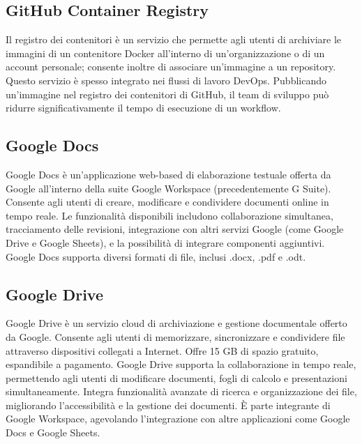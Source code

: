 \vspace{2em}
\subsection*{GitHub Container Registry}
\par Il registro dei contenitori è un servizio che permette agli utenti di archiviare le immagini di un contenitore Docker all'interno di un'organizzazione o di un account personale; consente inoltre di associare un'immagine a un repository. Questo servizio è spesso integrato nei flussi di lavoro DevOps. Pubblicando un'immagine nel registro dei contenitori di GitHub, il team di sviluppo può ridurre significativamente il tempo di esecuzione di un workflow.

\vspace{2em}
\subsection*{Google Docs}
\par Google Docs è un'applicazione web-based di elaborazione testuale offerta da Google all'interno della suite Google Workspace (precedentemente G Suite). Consente agli utenti di creare, modificare e condividere documenti online in tempo reale. Le funzionalità disponibili includono collaborazione simultanea, tracciamento delle revisioni, integrazione con altri servizi Google (come Google Drive e Google Sheets), e la possibilità di integrare componenti aggiuntivi. Google Docs supporta diversi formati di file, inclusi .docx, .pdf e .odt.

\vspace{2em}
\subsection*{Google Drive}
\par Google Drive è un servizio cloud di archiviazione e gestione documentale offerto da Google. Consente agli utenti di memorizzare, sincronizzare e condividere file attraverso dispositivi collegati a Internet. Offre 15 GB di spazio gratuito, espandibile a pagamento. Google Drive supporta la collaborazione in tempo reale, permettendo agli utenti di modificare documenti, fogli di calcolo e presentazioni simultaneamente. Integra funzionalità avanzate di ricerca e organizzazione dei file, migliorando l'accessibilità e la gestione dei documenti. È parte integrante di Google Workspace, agevolando l'integrazione con altre applicazioni come Google Docs e Google Sheets.

